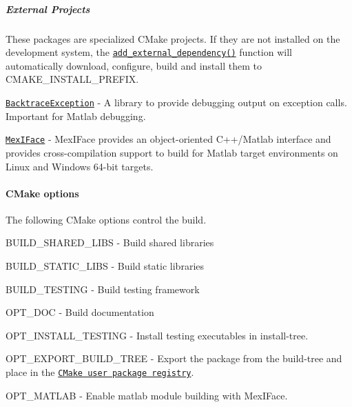 \subparagraph*{External Projects}

These packages are specialized C\+Make projects. If they are not installed on the development system, the \href{https://github.com/markjolah/UncommonCMakeModules/blob/master/AddExternalDependency.cmake}{\tt add\+\_\+external\+\_\+dependency()} function will automatically download, configure, build and install them to {\ttfamily C\+M\+A\+K\+E\+\_\+\+I\+N\+S\+T\+A\+L\+L\+\_\+\+P\+R\+E\+F\+IX}.


\begin{DoxyItemize}
\item \href{https://markjolah.github.io/BacktraceException}{\tt Backtrace\+Exception} -\/ A library to provide debugging output on exception calls. Important for Matlab debugging.
\item \href{https://markjolah.github.io/MexIFace}{\tt Mex\+I\+Face} -\/ Mex\+I\+Face provides an object-\/oriented C++/\+Matlab interface and provides cross-\/compilation support to build for Matlab target environments on Linux and Windows 64-\/bit targets.
\end{DoxyItemize}

\paragraph*{C\+Make options}

The following C\+Make options control the build.
\begin{DoxyItemize}
\item {\ttfamily B\+U\+I\+L\+D\+\_\+\+S\+H\+A\+R\+E\+D\+\_\+\+L\+I\+BS} -\/ Build shared libraries
\item {\ttfamily B\+U\+I\+L\+D\+\_\+\+S\+T\+A\+T\+I\+C\+\_\+\+L\+I\+BS} -\/ Build static libraries
\item {\ttfamily B\+U\+I\+L\+D\+\_\+\+T\+E\+S\+T\+I\+NG} -\/ Build testing framework
\item {\ttfamily O\+P\+T\+\_\+\+D\+OC} -\/ Build documentation
\item {\ttfamily O\+P\+T\+\_\+\+I\+N\+S\+T\+A\+L\+L\+\_\+\+T\+E\+S\+T\+I\+NG} -\/ Install testing executables in install-\/tree.
\item {\ttfamily O\+P\+T\+\_\+\+E\+X\+P\+O\+R\+T\+\_\+\+B\+U\+I\+L\+D\+\_\+\+T\+R\+EE} -\/ Export the package from the build-\/tree and place in the \href{https://cmake.org/cmake/help/latest/manual/cmake-packages.7.html#user-package-registry}{\tt C\+Make user package registry}.
\item {\ttfamily O\+P\+T\+\_\+\+M\+A\+T\+L\+AB} -\/ Enable matlab module building with Mex\+I\+Face.
\end{DoxyItemize}

